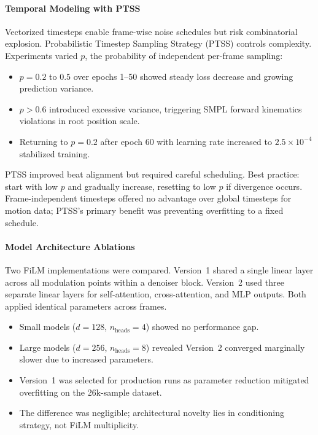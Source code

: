 \paragraph{Temporal Modeling with PTSS}
Vectorized timesteps enable frame-wise noise schedules but risk combinatorial explosion. Probabilistic Timestep Sampling Strategy (PTSS) controls complexity. Experiments varied $p$, the probability of independent per-frame sampling:
\begin{itemize}
    \item $p=0.2$ to $0.5$ over epochs 1–50 showed steady loss decrease and growing prediction variance.
    \item $p>0.6$ introduced excessive variance, triggering SMPL forward kinematics violations in root position scale.
    \item Returning to $p=0.2$ after epoch 60 with learning rate increased to $2.5 \times 10^{-4}$ stabilized training.
\end{itemize}
PTSS improved beat alignment but required careful scheduling. Best practice: start with low $p$ and gradually increase, resetting to low $p$ if divergence occurs. Frame-independent timesteps offered no advantage over global timesteps for motion data; PTSS's primary benefit was preventing overfitting to a fixed schedule.

\paragraph{Model Architecture Ablations}
Two FiLM implementations were compared. Version~1 shared a single linear layer across all modulation points within a denoiser block. Version~2 used three separate linear layers for self-attention, cross-attention, and MLP outputs. Both applied identical parameters across frames.
\begin{itemize}
    \item Small models ($d=128$, $n_{\text{heads}}=4$) showed no performance gap.
    \item Large models ($d=256$, $n_{\text{heads}}=8$) revealed Version~2 converged marginally slower due to increased parameters.
    \item Version~1 was selected for production runs as parameter reduction mitigated overfitting on the 26k-sample dataset.
    \item The difference was negligible; architectural novelty lies in conditioning strategy, not FiLM multiplicity.
\end{itemize}


